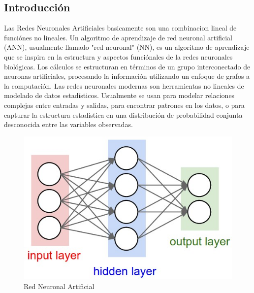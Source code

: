 \documentclass[a4paper,11pt,spanish]{book}
\begin{document}
      \subsection{Introducción}
	Las Redes Neuronales Artificiales basicamente son una combinacion lineal de funciónes no lineales.
	Un algoritmo de aprendizaje de red neuronal artificial (ANN), usualmente llamado "red neuronal" (NN), es un algoritmo de aprendizaje que se inspira en la estructura y aspectos funciónales
	de la redes neuronales biológicas. Los cálculos se estructuran en términos de un grupo interconectado de neuronas artificiales, procesando la información utilizando un enfoque de grafos
	a la computación. Las redes neuronales modernas son herramientas no lineales de modelado de datos estadísticos. Usualmente se usan para modelar relaciones complejas entre entradas y salidas,
	para encontrar patrones en los datos, o para capturar la estructura estadística en una distribución de probabilidad conjunta desconocida entre las variables observadas. \\
	\begin{figure}[h]
	  \includegraphics[scale=0.5]{./img/stanford_neural_net.jpeg}
	  \caption{Red Neuronal Artificial}
	  \label{fig:neural_network}
	\end{figure}
\end{document}
